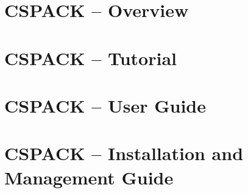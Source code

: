 
\setcounter{secnumdepth}{2}
\setcounter{tocdepth}{2}
\setlongtables
\makeindex
{}
\PScommands%


\setcounter{page}{1}
\part{CSPACK -- Overview}

\part{CSPACK -- Tutorial}

\part{CSPACK -- User Guide}

\part{CSPACK -- Installation and Management Guide}

\begin{appendix}

\end{appendix}



